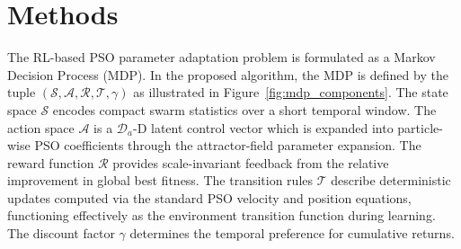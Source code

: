 \documentclass[final,5p,times]{elsarticle}
\newcommand{\symActiondim}{\mathcal{D}_a}
\newcommand{\symGamma}{\gamma}
\begin{document}
\section{Methods}
\label{sec:methods}
The RL-based PSO parameter adaptation problem is formulated as a Markov Decision Process (MDP).
In the proposed algorithm, the MDP is defined by the tuple $(\mathcal{S}, \mathcal{A}, \mathcal{R}, \mathcal{T}, \symGamma)$ as illustrated in Figure~\ref{fig:mdp_components}.
The state space $\mathcal{S}$ encodes compact swarm statistics over a short temporal window.
The action space $\mathcal{A}$ is a $\symActiondim$-D latent control vector which is expanded into particle-wise PSO coefficients through the attractor-field parameter expansion.
The reward function $\mathcal{R}$ provides scale-invariant feedback from the relative improvement in global best fitness.
The transition rules $\mathcal{T}$ describe deterministic updates computed via the standard PSO velocity and position equations, functioning effectively as the environment transition function during learning.
The discount factor $\symGamma$ determines the temporal preference for cumulative returns.
\end{document}
